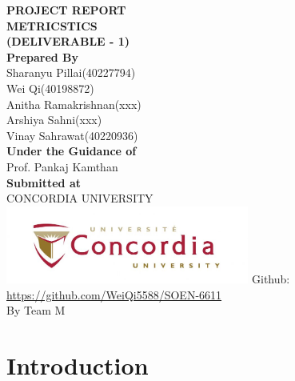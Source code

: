 \documentclass[english,12pt,a4paper]{report}
\begin{document}
	\begin{titlepage}
		\centering
		\Huge
		\textbf{PROJECT REPORT}\\
		\vspace{1cm}
		\textbf{METRICSTICS}\\
		\textbf{(DELIVERABLE - 1)}\\
		\vspace{1.5cm}
		\Large
		\textbf{Prepared By}\\
		\vspace{0.5cm}
		Sharanyu Pillai(40227794)\\
		Wei Qi(40198872)\\
		Anitha Ramakrishnan(xxx)\\
		Arshiya Sahni(xxx)\\
		Vinay Sahrawat(40220936)\\
		\vspace{1.5cm}
		\large
		\textbf{Under the Guidance of}\\
		Prof. Pankaj Kamthan \\
		\vspace{1.5cm}
		\textbf{Submitted at}\\
		CONCORDIA UNIVERSITY\\
		\centering
		\includegraphics[width=8cm]{concordia.jpg}
		\vfill
		Github:\\
		\url{https://github.com/WeiQi5588/SOEN-6611} \\
		By Team M
		\thispagestyle{empty} 
	\end{titlepage}
	
	\newpage 
	\setcounter{page}{0}
	\tableofcontents
	\clearpage
	
	

	
	\chapter{Introduction}
\end{document}
